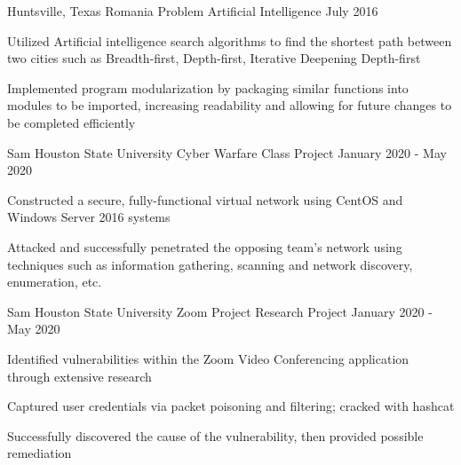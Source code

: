 
\begin{cventries}
	\cventry
	  {Huntsville, Texas} %
      {Romania Problem} %
	  {Artificial Intelligence} %
	  {July 2016} %
	  {
	    \begin{cvitems} %
			\item {Utilized Artificial intelligence search algorithms to find the shortest path between two cities such as Breadth-first, Depth-first, Iterative Deepening Depth-first}
			\item{Implemented program modularization by packaging similar functions into modules to be imported, increasing readability and allowing for future changes to be completed efficiently}				
		\end{cvitems}
	  }


	\cventry
	  {Sam Houston State University} %
  	  {Cyber Warfare} %
	  {Class Project} %
	  {January 2020 - May 2020} %
	  {
	    \begin{cvitems} %
			\item {Constructed a secure, fully-functional virtual network using CentOS and Windows Server 2016 systems}
			\item {Attacked and successfully penetrated the opposing team’s network using techniques such as information gathering, scanning and network discovery, enumeration, etc.}
		\end{cvitems}
	  }

	\cventry
	  {Sam Houston State University} %
      {Zoom Project} %
	  {Research Project} %
	  {January 2020 - May 2020} %
	  {
	    \begin{cvitems} %
			\item {Identified vulnerabilities within the Zoom Video Conferencing application through extensive research}
			\item {Captured user credentials via packet poisoning and filtering; cracked with hashcat}
			\item {Successfully discovered the cause of the vulnerability, then provided possible remediation }
		\end{cvitems}
	  }


\end{cventries}
